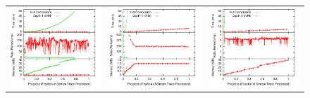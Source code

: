 \begin{figure}
\begin{center}
\vspace*{0.2in}

\begin{minipage}{\textwidth}
\begin{tabular}{ccc}
\includegraphics[width=\figurewidth]{../graphs/graphs/unified_brokervariance.pdf} & 
\includegraphics[width=\figurewidth]{../graphs/graphs/unified_tpch22.pdf} &
\includegraphics[width=\figurewidth]{../graphs/graphs/unified_vwap.pdf} \\

\end{tabular}
\end{minipage}
\end{center}
\end{figure}
